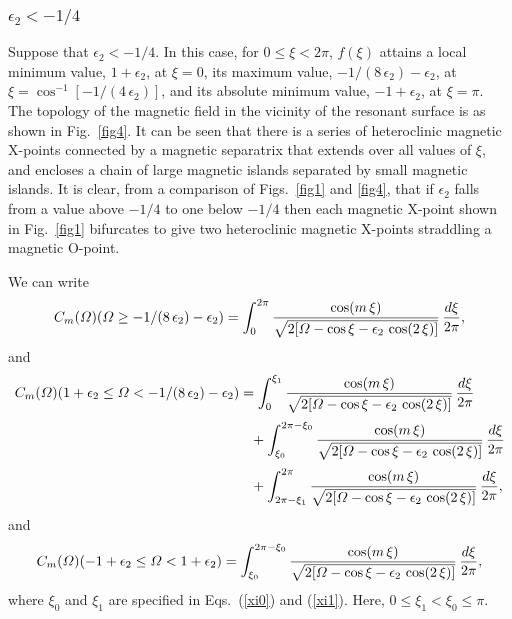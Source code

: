 \documentclass[12pt,prb,aps]{revtex4-1}
\begin{document}
\subsubsection{$\epsilon_2<-1/4$}
Suppose that $\epsilon_2<- 1/4$. In this case, for $0\leq \xi< 2\pi$, $f(\xi)$ attains a local minimum value, $1+\epsilon_2$, at $\xi=0$, its  maximum value, $-1/(8\,\epsilon_2)-\epsilon_2$, at $\xi=\cos^{-1}[-1/(4\,\epsilon_2)]$,
and its absolute minimum value, $-1+\epsilon_2$, at $\xi=\pi$.    The topology of the magnetic field 
in the vicinity of the resonant surface is as shown in Fig.~\ref{fig4}. It can be seen that there is  a series of heteroclinic 
magnetic X-points connected by a
magnetic separatrix that extends over all values of $\xi$, and encloses a chain of large magnetic islands separated by small
magnetic islands. It is clear, from a comparison of Figs.~\ref{fig1} and \ref{fig4},  that if $\epsilon_2$ falls from a value above $-1/4$ to one below $-1/4$ then each magnetic X-point
shown in Fig.~\ref{fig1} bifurcates to give two heteroclinic magnetic X-points straddling a magnetic O-point. 

We can write 
\begin{equation}
C_m({\mit\Omega})({\mit\Omega}\geq -1/(8\,\epsilon_2)-\epsilon_2) = \int_0^{2\pi}
\frac{\cos(m\,\xi)}{\sqrt{2[{\mit\Omega}-\cos\xi-\epsilon_2\,\cos(2\,\xi)]}}\,\frac{d\xi}{2\pi},
\end{equation} 
and
\begin{align}
C_m({\mit\Omega})(1+\epsilon_2\leq {\mit\Omega}< -1/(8\,\epsilon_2)-\epsilon_2) &= \int_{0}^{\xi_1}
\frac{\cos(m\,\xi)}{\sqrt{2[{\mit\Omega}-\cos\xi-\epsilon_2\,\cos(2\,\xi)]}}\,\frac{d\xi}{2\pi}\nonumber\\[0.5ex]
&\phantom{=}+\int_{\xi_0}^{2\pi-\xi_0}
\frac{\cos(m\,\xi)}{\sqrt{2[{\mit\Omega}-\cos\xi-\epsilon_2\,\cos(2\,\xi)]}}\,\frac{d\xi}{2\pi}\nonumber\\[0.5ex]
&\phantom{=}+\int_{2\pi-\xi_1}^{2\pi}
\frac{\cos(m\,\xi)}{\sqrt{2[{\mit\Omega}-\cos\xi-\epsilon_2\,\cos(2\,\xi)]}}\,\frac{d\xi}{2\pi},
\end{align} 
and
\begin{align}
C_m({\mit\Omega})(-1+\epsilon_2 \leq {\mit\Omega}< 1+\epsilon_2) = \int_{\xi_0}^{2\pi-\xi_0}
\frac{\cos(m\,\xi)}{\sqrt{2[{\mit\Omega}-\cos\xi-\epsilon_2\,\cos(2\,\xi)]}}\,\frac{d\xi}{2\pi},
\end{align} 
where $\xi_0$ and $\xi_1$ are specified in Eqs.~(\ref{xi0}) and (\ref{xi1}). 
Here, $0\leq \xi_1<\xi_0\leq \pi$. 
\end{document}
